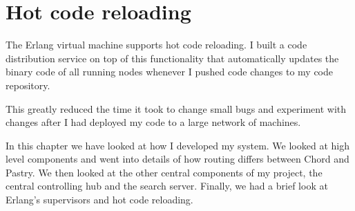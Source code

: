 \section{Hot code reloading}
The Erlang virtual machine supports hot code reloading.
I built a code distribution service on top of this functionality that automatically updates the binary code of all running nodes whenever I pushed code changes to my code repository.

This greatly reduced the time it took to change small bugs and experiment with changes after I had deployed my code to a large network of machines.

\mbox{}

In this chapter we have looked at how I developed my system. We looked at high level components and went into details of how routing differs between Chord and Pastry. We then looked at the other central components of my project, the central controlling hub and the search server.
Finally, we had a brief look at Erlang's supervisors and hot code reloading.
